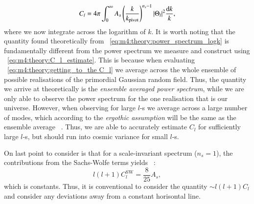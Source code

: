         \begin{equation}\label{eq:m4:theory:power_spectrum_logk}
            C_l = 4\pi\int_0^\infty A_s\left(\frac{k}{k_\mathrm{pivot}}\right)^{n_s-1}\abs{\Theta_l}^2\frac{\mathrm{d} k}{k},
        \end{equation}
        where we now integrate across the logarithm of $k$. It is worth noting that the quantity found theoretically from ~\cref{eq:m4:theory:power_spectrum_logk} is fundamentally different from the power spectrum we measure and construct using ~\cref{eq:m4:theory:C_l_estimate}. This is because when evaluating ~\cref{eq:m4:theory:getting_to_the C_l} we average across the whole ensemble of possible realisations of the primordial Gaussian random field. Thus, the quantity we arrive at theoretically is the \textit{ensemble averaged power spectrum}, while we are only able to observe the power spectrum for the one realisation that is our universe. However, when observing for large $l$-s we average across a large number of modes, which according to the \textit{ergothic assumption} will be the same as the ensemble average ~\cite{AST5220LectureNotes}. Thus, we are able to accurately estimate $C_l$ for sufficiently large $l$-s, but should run into cosmic variance for small $l$-s. 

        On last point to consider is that for a scale-invariant spectrum ($n_s=1$), the contributions from the Sachs-Wolfe terms yields ~\cite[Eq. 9.80]{dodelson2020modern}:
        \begin{equation}
            l(l+1)C_l^\mathrm{SW} = \frac{8}{25} A_s,
        \end{equation}
        which is constants. Thus, it is conventional to consider the quantity $\sim l(l+1)C_l$ and consider any deviations away from a constant horisontal line. 

